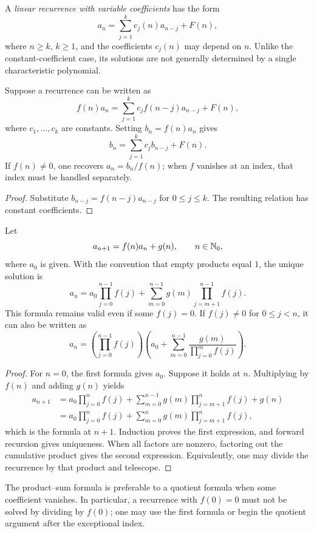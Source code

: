 \documentclass[11pt, oneside]{article}
\begin{document}
\begin{definition}
A \emph{linear recurrence with variable coefficients} has the form
\[
a_n=\sum_{j=1}^kc_j(n)a_{n-j}+F(n),
\]
where $n\ge k$, $k\ge1$, and the coefficients $c_j(n)$ may depend on $n$. Unlike the constant-coefficient case, its solutions are not generally determined by a single characteristic polynomial.
\end{definition}
\begin{proposition}
Suppose a recurrence can be written as
\[
f(n)a_n=\sum_{j=1}^kc_jf(n-j)a_{n-j}+F(n),
\]
where $c_1, \ldots, c_k$ are constants. Setting $b_n=f(n)a_n$ gives
\[
b_n=\sum_{j=1}^kc_jb_{n-j}+F(n).
\]
If $f(n)\ne0$, one recovers $a_n=b_n/f(n)$; when $f$ vanishes at an index, that index must be handled separately.
\end{proposition}
\begin{proof}
Substitute $b_{n-j}=f(n-j)a_{n-j}$ for $0\le j\le k$. The resulting relation has constant coefficients.
\end{proof}
\begin{proposition}\label{prop:varfirst}
Let
\[
a_{n+1}=f(n)a_n+g(n), \qquad n\in\mathbb{N}_0,
\]
where $a_0$ is given. With the convention that empty products equal $1$, the unique solution is
\[
\boxed{\displaystyle
a_n=a_0\prod_{j=0}^{n-1}f(j)
+\sum_{m=0}^{n-1}g(m)\prod_{j=m+1}^{n-1}f(j).}
\]
This formula remains valid even if some $f(j)=0$. If $f(j)\ne0$ for $0\le j<n$, it can also be written as
\[
a_n=\left(\prod_{j=0}^{n-1}f(j)\right)
\left(a_0+\sum_{m=0}^{n-1}\frac{g(m)}{\prod_{j=0}^{m}f(j)}\right).
\]
\end{proposition}
\begin{proof}
For $n=0$, the first formula gives $a_0$. Suppose it holds at $n$. Multiplying by $f(n)$ and adding $g(n)$ yields
\[
\begin{aligned}
a_{n+1}
&=a_0\prod_{j=0}^{n}f(j)
+\sum_{m=0}^{n-1}g(m)\prod_{j=m+1}^{n}f(j)+g(n)\\
&=a_0\prod_{j=0}^{n}f(j)
+\sum_{m=0}^{n}g(m)\prod_{j=m+1}^{n}f(j),
\end{aligned}
\]
which is the formula at $n+1$. Induction proves the first expression, and forward recursion gives uniqueness. When all factors are nonzero, factoring out the cumulative product gives the second expression. Equivalently, one may divide the recurrence by that product and telescope.
\end{proof}
\begin{remark}
The product--sum formula is preferable to a quotient formula when some coefficient vanishes. In particular, a recurrence with $f(0)=0$ must not be solved by dividing by $f(0)$; one may use the first formula or begin the quotient argument after the exceptional index.
\end{remark}
\end{document}
